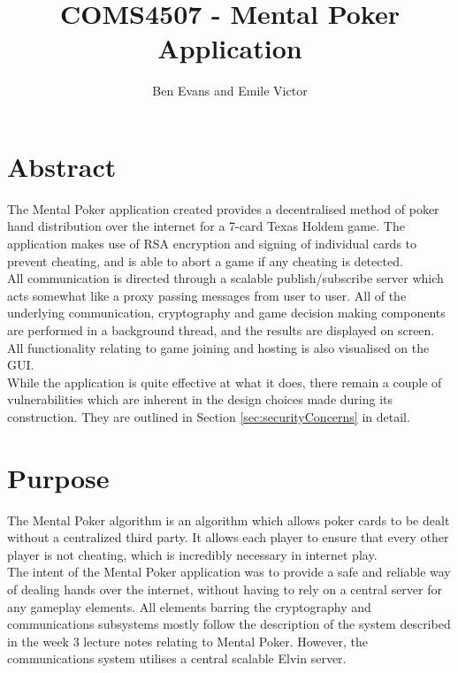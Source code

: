 \documentclass[11pt, oneside]{article}   	%
\title{COMS4507 - Mental Poker Application}
\author{Ben Evans and Emile Victor}
\begin{document}
\maketitle

\section{Abstract}

The Mental Poker application created provides a decentralised method of poker hand distribution over the internet for a 7-card Texas Holdem game. The application makes use of RSA encryption and signing of individual cards to prevent cheating, and is able to abort a game if any cheating is detected.\\
					
All communication is directed through a scalable publish/subscribe server which acts somewhat like a proxy passing messages from user to user. All of the underlying communication, cryptography and game decision making components are performed in a background thread, and the results are displayed on screen. All functionality relating to game joining and hosting is also visualised on the GUI.\\
					
While the application is quite effective at what it does, there remain a couple of vulnerabilities which are inherent in the design choices made during its construction. They are outlined in Section \ref{sec:securityConcerns} in detail.

\section {Purpose}

The Mental Poker algorithm is an algorithm which allows poker cards to be dealt without a centralized third party. It allows each player to ensure that every other player is not cheating, which is incredibly necessary in internet play. \\

The intent of the Mental Poker application was to provide a safe and reliable way of dealing hands over the internet, without having to rely on a central server for any gameplay elements. All elements barring the cryptography and communications subsystems mostly follow the description of the system described in the week 3 lecture notes relating to Mental Poker. However, the communications system utilises a central scalable Elvin server.\\
\end{document}
